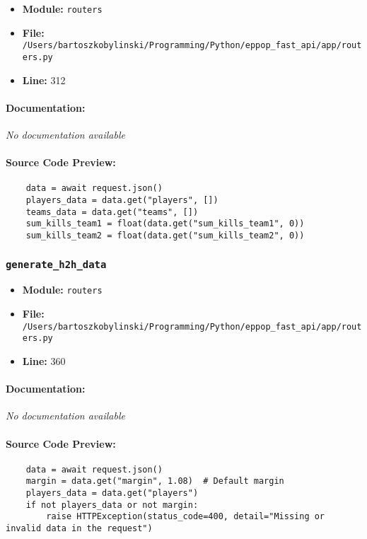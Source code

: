 \documentclass[11pt,a4paper]{article}
\begin{document}
\begin{itemize}
    \item \textbf{Module:} \texttt{routers}
    \item \textbf{File:} \texttt{/Users/bartoszkobylinski/Programming/Python/eppop\_fast\_api/app/routers.py}
    \item \textbf{Line:} 312
\end{itemize}

\paragraph{Documentation:} \textit{No documentation available}

\paragraph{Source Code Preview:}
\begin{verbatim}
    data = await request.json()
    players_data = data.get("players", [])
    teams_data = data.get("teams", [])
    sum_kills_team1 = float(data.get("sum_kills_team1", 0))
    sum_kills_team2 = float(data.get("sum_kills_team2", 0))
\end{verbatim}

\vspace{1em}
\subsubsection{\texttt{generate\_h2h\_data}}

\begin{itemize}
    \item \textbf{Module:} \texttt{routers}
    \item \textbf{File:} \texttt{/Users/bartoszkobylinski/Programming/Python/eppop\_fast\_api/app/routers.py}
    \item \textbf{Line:} 360
\end{itemize}

\paragraph{Documentation:} \textit{No documentation available}

\paragraph{Source Code Preview:}
\begin{verbatim}
    data = await request.json()
    margin = data.get("margin", 1.08)  # Default margin
    players_data = data.get("players")
    if not players_data or not margin:
        raise HTTPException(status_code=400, detail="Missing or invalid data in the request")
\end{verbatim}
\end{document}
